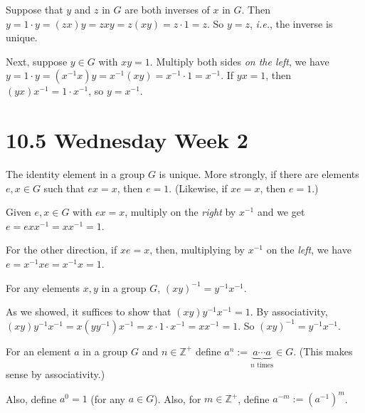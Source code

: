 \documentclass{notes}
\begin{document}
\begin{prf}
  Suppose that $y$ and $z$ in $G$ are both inverses of $x$ in $G$.
  Then $y = 1 \cdot y = (z x) y = z x y = z (x y) = z \cdot 1 = z$.
  So $y = z$, \textit{i.e.}, the inverse is unique.

  Next, suppose $y \in G$ with $x y = 1$.
  Multiply both sides \textit{on the left}, we have $y = 1 \cdot y = (x^{-1} x) y = x^{-1} (x y) = x^{-1} \cdot 1 = x^{-1}$.
  If $y x = 1$, then $(y x) x^{-1} = 1 \cdot x^{-1}$, so $y = x^{-1}$.
\end{prf}

\newpage

\section{10.5 Wednesday Week 2}

\begin{lem}
  The identity element in a group $G$ is unique.
  More strongly, if there are elements $e, x \in G$ such that $e x = x$, then $e = 1$.
  (Likewise, if $x e = x$, then $e = 1$.)
\end{lem}

\begin{prf}
  Given $e, x \in G$ with $e x = x$, multiply on the \textit{right} by $x^{-1}$ and we get $e = e x x^{-1} = x x^{-1} = 1$.

  For the other direction, if $x e = x$, then, multiplying by $x^{-1}$ on the \textit{left}, we have $e = x^{-1} x e = x^{-1} x = 1$.
\end{prf}

\begin{lem}
  For any elements $x, y$ in a group $G$, $(x y)^{-1} = y^{-1} x^{-1}$. 
\end{lem}

\begin{prf}
  As we showed, it suffices to show that $(x y) y^{-1} x^{-1} = 1$.
  By associativity, $(x y) y^{-1} x^{-1} = x (y y^{-1}) x^{-1} = x \cdot 1 \cdot x^{-1} = x x^{-1} = 1$.
  So $(x y)^{-1} = y^{-1} x^{-1}$.
\end{prf}

\begin{defn}
  For an element $a$ in a group $G$ and $n \in \mathbb Z^+$ define $a^n := \underbrace{a \cdots a}_\text{$n$ times} \in G$.
  (This makes sense by associativity.)

  Also, define $a^0 = 1$ (for any $a \in G$).
  Also, for $m \in \mathbb Z^+$, define $a^{-m} := (a^{-1})^m$.
\end{defn}
\end{document}

